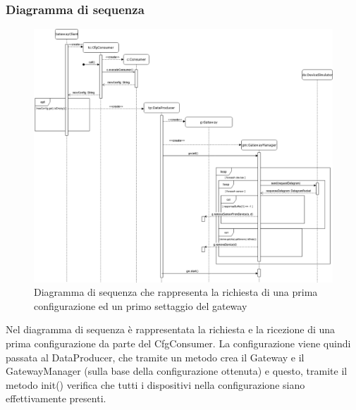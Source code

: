 	\begin{landscape}
		\subsubsection{Diagramma di sequenza}%
		  	\begin{figure}[H]
				\centering
				\includegraphics[scale=0.400]{res/images/GATEWAY/RichiestaInvioGateway.png}
				\caption{Diagramma di sequenza che rappresenta la richiesta di una prima configurazione ed un primo settaggio del gateway}
				\label{Diagramma 3}
			\end{figure}
			Nel diagramma di sequenza è rappresentata la richiesta e la ricezione di una prima configurazione da parte del CfgConsumer.
			\newline
			La configurazione viene quindi passata al DataProducer, che tramite un metodo crea il Gateway e il GatewayManager (sulla base della configurazione ottenuta) e questo, tramite il metodo init() verifica che tutti i dispositivi nella configurazione siano effettivamente presenti.
	\end{landscape}
	
